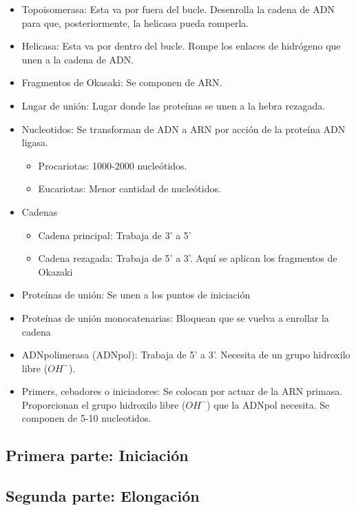 \begin{itemize}
    \item Topoisomerasa: Esta va  por fuera del bucle. Desenrolla la cadena de ADN para que, posteriormente, la helicasa pueda romperla.
    \item Helicasa: Esta va por dentro del bucle. Rompe los enlaces de hidrógeno que unen a la cadena de ADN.
    \item Fragmentos de Okasaki: Se componen de ARN.
    \item Lugar de unión: Lugar donde las proteínas se unen a la hebra rezagada.
    \item Nucleotidos: Se transforman de ADN a ARN por acción de la proteína ADN ligasa. 
        \begin{itemize}
            \item Procariotas: 1000-2000 nucleótidos.
            \item Eucariotas: Menor cantidad de nucleótidos.
        \end{itemize}
        
    \item Cadenas
        \begin{itemize}
            \item Cadena principal: Trabaja de 3' a 5'
            \item Cadena rezagada: Trabaja de 5' a 3'. Aquí se aplican los fragmentos de Okazaki
        \end{itemize}
    \item Proteínas de unión: Se unen a los puntos de iniciación
    \item Proteínas de unión monocatenarias: Bloquean que se vuelva a enrollar la cadena
    \item ADNpolimerasa (ADNpol): Trabaja de 5' a 3'. Necesita de un grupo hidroxilo libre ($OH^{-}$).
    \item Primers, cebadores o iniciadores: Se colocan por actuar de la ARN primasa. Proporcionan el grupo hidroxilo libre ($OH^{-}$) que la ADNpol necesita. Se componen de 5-10 nucleotidos.
\end{itemize}

\subsection{Primera parte: Iniciación}


\subsection{Segunda parte: Elongación}




